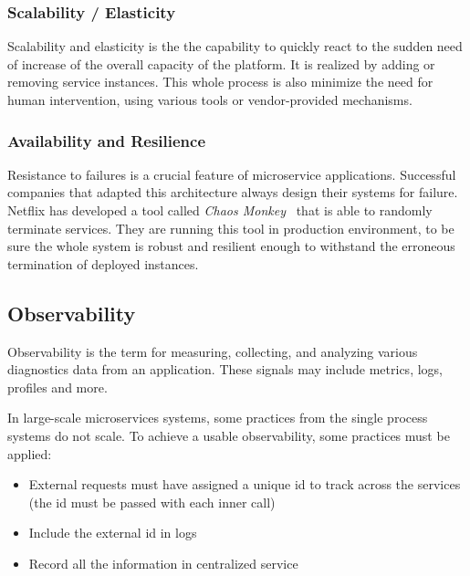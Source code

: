 \documentclass[thesis=M,english,hidelinks]{FITthesis}[2012/10/20]
\begin{document}
\subsubsection{Scalability / Elasticity}
\label{sec:scalability}
Scalability and elasticity is the the capability to quickly react to the sudden need of increase of the overall capacity of the platform. It is realized by adding or removing service instances. This whole process is also minimize the need for human intervention, using various tools or vendor-provided mechanisms.

\subsubsection{Availability and Resilience}
\label{sec:resilience}

Resistance to failures is a crucial feature of microservice applications. Successful companies that adapted this architecture always design their systems for failure. Netflix has developed a tool called \textit{Chaos Monkey}~\cite{chaos-monkey} that is able to randomly terminate services. They are running this tool in production environment, to be sure the whole system is robust and resilient enough to withstand the erroneous termination of deployed instances.


\subsection{Observability}
Observability is the term for measuring, collecting, and analyzing various diagnostics data from an application. These signals may include metrics, logs, profiles and more.

In large-scale microservices systems, some practices from the single process systems do not scale. To achieve a usable observability, some practices must be applied:

\begin{itemize}
    \item External requests must have assigned a unique id to track across the services (the id must be passed with each inner call)
    \item Include the external id in logs
    \item Record all the information in centralized service
\end{itemize}

% 
% 
\end{document}
